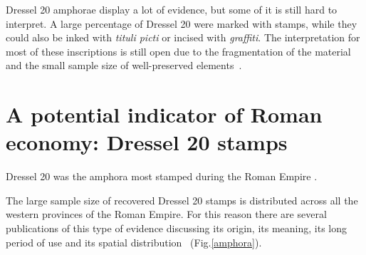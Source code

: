 \documentclass[review]{elsarticle}
\newcommand{\memo}[2]{\textcolor{#1}{#2}}
\newcommand{\xavi}[1]{\memo{magenta}{XRC: #1\\}}
\begin{document}
Dressel 20 amphorae display a lot of evidence, but some of it is still hard to interpret. A large percentage of Dressel 20 were marked with stamps, while they could also be inked with \textit{tituli picti} or incised with \textit{graffiti}. The interpretation for most of these inscriptions is still open due to the fragmentation of the material and the small sample size of well-preserved elements~\citep{aguilera_evolucion_2007,rovira_guardiola_grafitos_2007}. 

 

\section{A potential indicator of Roman economy: Dressel 20 stamps}

Dressel 20 was the amphora most stamped during the Roman Empire \citep[18]{millet_anforas_1998}. 



The large sample size of recovered Dressel 20 stamps is distributed across all the western provinces of the Roman Empire. For this reason there are several publications of this type of evidence discussing its origin, its meaning, its long period of use and its spatial distribution~\citep{dressel_ricerche_1878,
rodriguez_economioleicola_1977,
chicepi1985,millet_anforas_1998, remesal_sellar_2016} (Fig.\ref{amphora}).

\end{document}
